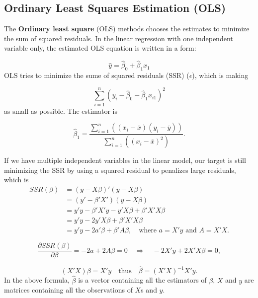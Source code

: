 \documentclass[11pt]{article}
\begin{document}
\subsection{Ordinary Least Squares Estimation (OLS)}

The \textbf{Ordinary least square} (OLS) methods chooses the estimates to minimize the sum of squared residuals. In the linear regression with one independent 
variable only, the estimated OLS equation is written in a form:

\[
    \hat{y} = \hat{\beta}_0 + \hat{\beta}_1 x_1
\]
OLS tries to minimize the sume of squared residuals (SSR) ($\epsilon$), which is making 

\[
    \sum_{i=1}^{n} \left( y_i - \hat{\beta}_0 - \hat{\beta}_1 x_{i1}\right)^2
\]
as small as possible. The estimator is 

\[
    \hat{\beta}_1 = \frac{\sum_{i=1}^{n} \left( (x_i - \bar{x})(y_i - \bar{y}) \right)}{\sum_{i=1}^{n} \left( (x_i - \bar{x})^2 \right)}.
\]

If we have multiple independent variables in the linear model, our target is still minimizing the SSR by using a squared residual to penalizes
large residuals, which is 
\begin{align*}
    SSR(\beta) &= (y - X\beta)'(y - X\beta) \\
               &= (y' - \beta'X')(y - X\beta) \\
               &= y'y - \beta'X'y - y'X\beta + \beta'X'X\beta \\
               &= y'y - 2y'X\beta + \beta'X'X\beta \\
               &= y'y - 2a'\beta + \beta'A\beta, \quad \text{where } a = X'y \text{ and } A = X'X.
    \end{align*}

\[
\frac{\partial SSR(\beta)}{\partial \beta} = -2a + 2A\beta = 0
\quad \Rightarrow \quad -2X'y + 2X'X\beta = 0,
\]

\[
(X'X)\beta = X'y \quad \text{thus} \quad \hat{\beta} = (X'X)^{-1}X'y.
\]
In the above formula, \( \hat{\beta} \) is a vector containing all the estimators of \( \beta \), 
\( X \) and \( y \) are matrices containing all the observations of \( X \)s and \( y \).
\end{document}
